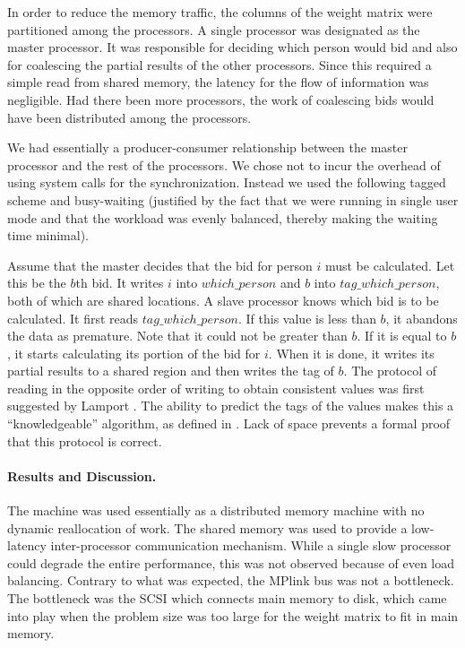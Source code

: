 In order to reduce the memory traffic, the  
columns of the weight matrix were partitioned among the processors.
A single processor was designated as the master processor.
It was responsible for deciding which person would bid
and also for coalescing the partial results of the 
other processors. Since this required a simple read from
shared memory, the latency for the flow of information
was negligible. Had there been more processors, the 
work of coalescing bids would have been distributed among the processors.

We had essentially a producer-consumer relationship
between the master processor and the rest of the processors.
We chose not to incur the overhead of using system calls for
the synchronization. Instead we used the following tagged scheme
and busy-waiting (justified by the fact that we were running in
single user mode and that the workload was evenly balanced, thereby
making the waiting time minimal).

Assume that the master decides that the bid for person $i$ 
must be calculated.  Let this be the $b$th bid. It writes $i$ into
$which\_person$ and $b$ into $tag\_which\_person$, both of which
are shared locations. A slave processor knows which bid is
to be calculated. It first reads $tag\_which\_person$. If this
value is less than $b$, it abandons the data as premature. Note that
it could not be greater than $b$. If it is equal to $b$, it 
starts calculating its portion of the bid for $i$. When it is done,
it writes its partial results to a shared region and then writes
the tag of $b$. The protocol of reading in the opposite order of
writing to obtain consistent values was first suggested by 
Lamport \cite{la77}.
The ability to predict the tags of the values makes this a
``knowledgeable'' algorithm, as defined in \cite{su192}.
Lack of space prevents a formal proof that this protocol is correct.


\paragraph{Results and Discussion.}
The machine was used essentially as a distributed
memory machine with no dynamic reallocation of work. The shared memory 
was used to provide a low-latency inter-processor communication
mechanism.
While a single slow processor could degrade the entire performance,
this was not observed because of even load balancing.
Contrary to what was expected, the MPlink bus was not a bottleneck. 
The bottleneck was the SCSI which connects main memory to disk,
which came into play when the problem size
was too large for the weight matrix to fit in main memory.

